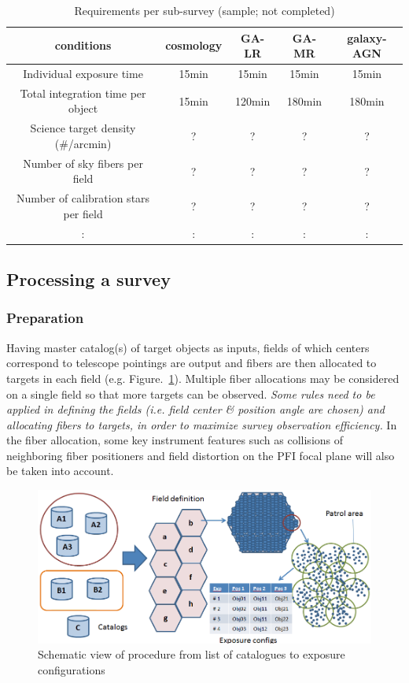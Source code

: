 \documentclass[a4paper,notitlepage]{article}
\begin{document}
\begin{table}[htb]
\caption{Requirements per sub-survey (sample; not completed)}
\label{tab:sciops-scireq-subsvy}
\begin{center}
\begin{tabular}{c|c|c|c|c}
conditions & cosmology & GA-LR & GA-MR & galaxy-AGN \\ \hline
\hline
Individual exposure time & 15min & 15min & 15min & 15min \\
\hline
Total integration time per object & 15min & 120min & 180min & 180min \\
\hline
Science target density (\#/arcmin) & ? & ? & ? & ? \\
\hline
Number of sky fibers per field & ? & ? & ? & ? \\
\hline
Number of calibration stars per field & ? & ? & ? & ? \\
\hline
 : & : & : & : & : \\
\end{tabular}
\end{center}
\end{table}

\subsection{Processing a survey}

\subsubsection{Preparation}

Having master catalog(s) of target objects as inputs, fields of which
centers correspond to telescope pointings are output and fibers are then
allocated to targets in each field
(e.g. Figure.~\ref{fig:sciops-scireq-slide-svyexp}). Multiple fiber
allocations may be considered on a single field so that more targets can
be observed. {\it Some rules need to be applied in defining the fields
(i.e. field center \& position angle are chosen) and allocating fibers
to targets, in order to maximize survey observation efficiency.}  In the
fiber allocation, some key instrument features such as collisions of
neighboring fiber positioners and field distortion on the PFI focal
plane will also be taken into account.

\begin{figure}[htb]
  \begin{center}
    \includegraphics[width=.75\linewidth]{sciops-scireq-slide-svyexp.png}
  \end{center}
  \caption{Schematic view of procedure from list of catalogues to exposure 
    configurations}
  \label{fig:sciops-scireq-slide-svyexp}
\end{figure}
\end{document}
